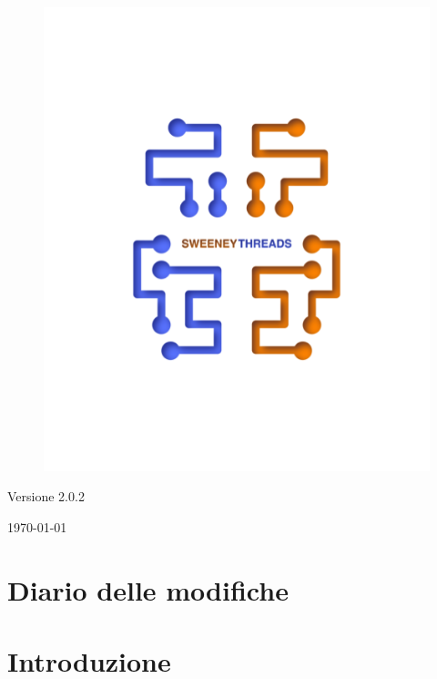 \documentclass[a4paper]{article}
\begin{document}
\begin{titlepage}
		\begin{figure}[H]
			\centering
			\includegraphics[scale=0.8]{sweeney.png}
		\end{figure}
		\begin{center}
			Versione 2.0.2
		\end{center}
		{\large \today} \\ [3cm] 
		\vfill  
	\end{titlepage}
	
	
	\tableofcontents
	
	\newpage 
	\section*{Diario delle modifiche}

	\newpage \section{Introduzione}
\end{document}
